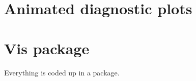 \documentclass[12pt]{article}
\newenvironment{Shaded}{\begin{snugshade}}{\end{snugshade}}
\newcommand{\DataTypeTok}[1]{\textcolor[rgb]{0.13,0.29,0.53}{#1}}
\newcommand{\KeywordTok}[1]{\textcolor[rgb]{0.13,0.29,0.53}{\textbf{#1}}}
\newcommand{\NormalTok}[1]{#1}
\newcommand{\OperatorTok}[1]{\textcolor[rgb]{0.81,0.36,0.00}{\textbf{#1}}}
\newcommand{\OtherTok}[1]{\textcolor[rgb]{0.56,0.35,0.01}{#1}}
\newcommand{\StringTok}[1]{\textcolor[rgb]{0.31,0.60,0.02}{#1}}
\begin{document}
\hypertarget{animated-diagnostic-plots}{%
\section{Animated diagnostic plots}\label{animated-diagnostic-plots}}

\begin{Shaded}
\end{Shaded}

\hypertarget{vis-package}{%
\section{Vis package}\label{vis-package}}

Everything is coded up in a package.

\clearpage



\end{document}
